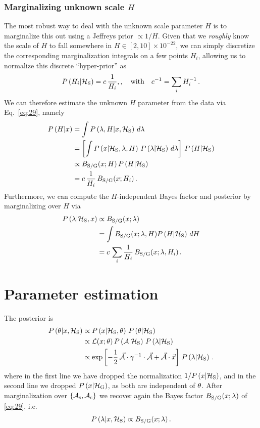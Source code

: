 \documentclass[aps,prd,onecolumn,notitlepage,nofootinbib,superscriptaddress,altaffilletter,floatfix]{revtex4-1}
\begin{document}
\subsubsection{Marginalizing unknown scale $H$}
\label{sec:marg-unkn-scale}

The most robust way to deal with the unknown scale parameter $H$ is to marginalize this out using a Jeffreys prior $\propto 1/H$. Given that we
\emph{roughly} know the scale of $H$ to fall somewhere in $H\in{[2,10]}\times10^{-22}$, we can simply discretize the corresponding marginalization
integrals on a few points ${H_i}$, allowing us to normalize this discrete ``hyper-prior'' as
\begin{equation}
  \label{eq:44}
  P\left(H_i|\mathcal{H}_{\mathrm{S}}\right) = c\,\frac{1}{H_i},,\quad\text{with}\quad c^{-1} = \sum_i H_i^{-1}\,.
\end{equation}
We can therefore estimate the unknown $H$ parameter from the data via Eq.~\eqref{eq:29}, namely
\begin{align}
  \label{eq:45}
  P\left(H|x\right) &= \int P\left(\lambda,H|x,\mathcal{H}_{\mathrm{S}}\right)\,d\lambda\\
  &= \left[\int P\left(x|\mathcal{H}_{\mathrm{S}},\lambda,H\right)\,P\left(\lambda|\mathcal{H}_{\mathrm{S}}\right)\,d\lambda\right]\,P\left(H|\mathcal{H}_{\mathrm{S}}\right)\\
  &\propto B_{\mathrm{S/G}}(x;H)\,P\left(H|\mathcal{H}_{\mathrm{S}}\right) \\
  &= c\,\frac{1}{H_i}\,B_{\mathrm{S/G}}(x;H_i)\,.
\end{align}
Furthermore, we can compute the $H$-independent Bayes factor and posterior by marginalizing over $H$ via
\begin{align}
  \label{eq:46}
  P\left(\lambda|\mathcal{H}_{\mathrm{S}},x\right) &\propto B_{\mathrm{S/G}}(x;\lambda)\\
  &=\int B_{\mathrm{S/G}}(x;\lambda,H)P\left(H|\mathcal{H}_{\mathrm{S}}\right)\,dH\\
  &= c\,\sum_i \frac{1}{H_i} \, B_{\mathrm{S/G}}(x;\lambda,H_i)\,.
\end{align}

\section{Parameter estimation}
\label{sec:parameter-estimation}

The posterior is
\begin{align}
  P\left(\theta|x,\mathcal{H}_{\mathrm{S}}\right) &\propto P\left(x|\mathcal{H}_{\mathrm{S}},\theta\right)\,P\left(\theta|\mathcal{H}_{\mathrm{S}}\right) \notag\\
    &\propto \mathcal{L}(x;\theta)\,P\left(\mathcal{A}|\mathcal{H}_{\mathrm{S}}\right)\,P\left(\lambda|\mathcal{H}_{\mathrm{S}}\right) \notag\\
    &\propto \exp\left[-\frac{1}{2}\, \vec{\mathcal{A}}\cdot\gamma^{-1}\cdot\vec{\mathcal{A}} + \vec{\mathcal{A}}\cdot\vec{x}\right]\,P\left(\lambda|\mathcal{H}_{\mathrm{S}}\right)\,.  \label{eq:30}
\end{align}
where in the first line we have dropped the normalization $1/P\left(x|\mathcal{H}_{\mathrm{S}}\right)$, and in the second line we dropped $P\left(x|\mathcal{H}_{\mathrm{G}}\right)$, as both are
independent of $\theta$.
After marginalization over $\{\mathcal{A}_{\mathrm{s}},\mathcal{A}_{\mathrm{c}}\}$ we recover again the Bayes factor $B_{\mathrm{S/G}}(x;\lambda)$ of \eqref{eq:29}, i.e.
\begin{equation}
  \label{eq:32}
  P\left(\lambda|x,\mathcal{H}_{\mathrm{S}}\right) \propto B_{\mathrm{S/G}}(x;\lambda)\,.
\end{equation}
\end{document}
